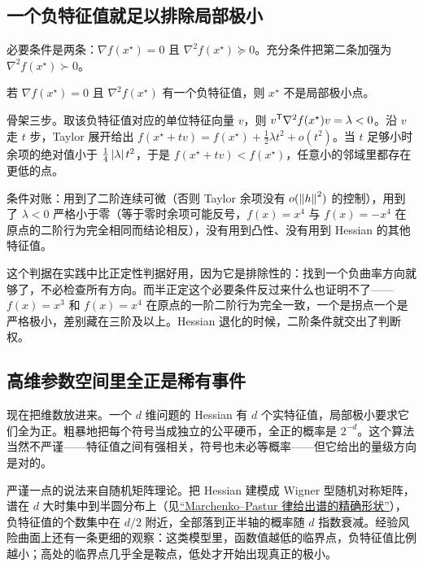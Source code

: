 \subsection{一个负特征值就足以排除局部极小}

必要条件是两条：\(\nabla f(x^\star)=0\) 且 \(\nabla^2 f(x^\star)\succeq0\)。充分条件把第二条加强为 \(\nabla^2 f(x^\star)\succ0\)。

\begin{proposition}
若 \(\nabla f(x^\star)=0\) 且 \(\nabla^2 f(x^\star)\) 有一个负特征值，则 \(x^\star\) 不是局部极小点。
\end{proposition}

骨架三步。取该负特征值对应的单位特征向量 \(v\)，则 \(v^{\mathsf{T}}\nabla^2 f(x^\star)v=\lambda<0\)。沿 \(v\) 走 \(t\) 步，Taylor 展开给出 \(f(x^\star+tv)=f(x^\star)+\tfrac12\lambda t^2+o(t^2)\)。当 \(t\) 足够小时余项的绝对值小于 \(\tfrac14\left|\lambda\right|t^2\)，于是 \(f(x^\star+tv)<f(x^\star)\)，任意小的邻域里都存在更低的点。

条件对账：用到了二阶连续可微（否则 Taylor 余项没有 \(o(\left\lVert h\right\rVert^2)\) 的控制），用到了 \(\lambda<0\) 严格小于零（等于零时余项可能反号，\(f(x)=x^4\) 与 \(f(x)=-x^4\) 在原点的二阶行为完全相同而结论相反），没有用到凸性、没有用到 Hessian 的其他特征值。

这个判据在实践中比正定性判据好用，因为它是排除性的：找到一个负曲率方向就够了，不必检查所有方向。而半正定这个必要条件反过来什么也证明不了——\(f(x)=x^3\) 和 \(f(x)=x^4\) 在原点的一阶二阶行为完全一致，一个是拐点一个是严格极小，差别藏在三阶及以上。Hessian 退化的时候，二阶条件就交出了判断权。

\subsection{高维参数空间里全正是稀有事件}

现在把维数放进来。一个 \(d\) 维问题的 Hessian 有 \(d\) 个实特征值，局部极小要求它们全为正。粗暴地把每个符号当成独立的公平硬币，全正的概率是 \(2^{-d}\)。这个算法当然不严谨——特征值之间有强相关，符号也未必等概率——但它给出的量级方向是对的。

严谨一点的说法来自随机矩阵理论。把 Hessian 建模成 Wigner 型随机对称矩阵，谱在 \(d\) 大时集中到半圆分布上（见\hyperref[sec:11-Mathematical-Statistics/09-Random-Matrix-Theory/02]{``Marchenko--Pastur 律给出谱的精确形状''}），负特征值的个数集中在 \(d/2\) 附近，全部落到正半轴的概率随 \(d\) 指数衰减。经验风险曲面上还有一条更细的观察：这类模型里，函数值越低的临界点，负特征值比例越小；高处的临界点几乎全是鞍点，低处才开始出现真正的极小。

